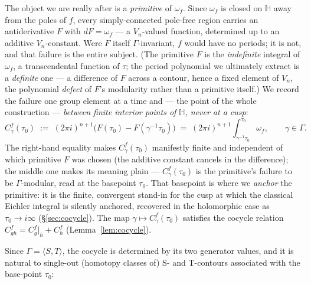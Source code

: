\documentclass[11pt]{article}
\numberwithin{equation}{section}  %
\newcommand{\HH}{\mathbb{H}}
\begin{document}
The object we are really after is a \emph{primitive} of $\omega_f$.  Since
$\omega_f$ is closed on $\HH$ away from the poles of $f$, every
simply-connected pole-free region carries an antiderivative $F$ with
$dF = \omega_f$ --- a $V_n$-valued function, determined up to an additive
$V_n$-constant.  Were $F$ itself $\Gamma$-invariant, $f$ would have no
periods; it is not, and that failure is the entire subject.  (The
primitive $F$ is the \emph{indefinite} integral of $\omega_f$, a
transcendental function of $\tau$; the period polynomial we ultimately
extract is a \emph{definite} one --- a difference of $F$ across a contour,
hence a fixed element of $V_n$, the polynomial \emph{defect} of $F$'s
modularity rather than a primitive itself.)  We record the
failure one group element at a time and --- the point of the whole
construction --- \emph{between finite interior points of $\HH$, never at a
cusp}:
\begin{equation}\label{eq:ES-cocycle}
  C^f_\gamma(\tau_0)
  \;:=\; (2\pi i)^{n+1}\bigl(F(\tau_0) - F(\gamma^{-1}\tau_0)\bigr)
  \;=\; (2\pi i)^{n+1}\!\int_{\gamma^{-1}\tau_0}^{\tau_0}\!\omega_f,
  \qquad \gamma \in \Gamma.
\end{equation}
The right-hand equality makes $C^f_\gamma(\tau_0)$ manifestly finite and
independent of which primitive $F$ was chosen (the additive constant
cancels in the difference); the middle one makes its meaning plain ---
$C^f_\gamma(\tau_0)$ is the primitive's failure to be $\Gamma$-modular,
read at the basepoint $\tau_0$.  That basepoint is where we \emph{anchor}
the primitive: it is the finite, convergent stand-in for the cusp at which
the classical Eichler integral is silently anchored, recovered in the
holomorphic case as $\tau_0 \to i\infty$ (\S\ref{sec:cocycle}).  The map
$\gamma \mapsto C^f_\gamma(\tau_0)$ satisfies the cocycle relation
$C^f_{gh} = C^f_g|_h + C^f_h$ (Lemma~\ref{lem:cocycle}).

Since $\Gamma = \langle S, T\rangle$, the cocycle is determined by its two
generator values, and it is natural to single-out (homotopy classes of) S- and 
T-contours associated with the base-point $\tau_0$:
 
\end{document}
